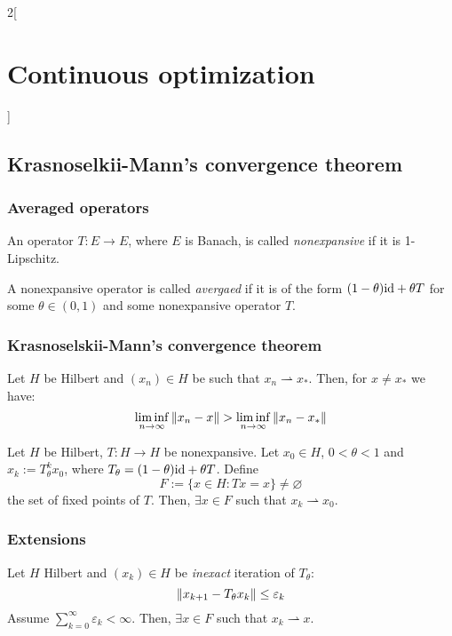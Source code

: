\documentclass[../../../main_math.tex]{subfiles}
\begin{document}
\begin{multicols}{2}[\section{Continuous optimization}]
  \subsection{Krasnoselkii-Mann's convergence theorem}
  \subsubsection{Averaged operators}
  \begin{definition}
    An operator $T:E\to E$, where $E$ is Banach, is called \emph{nonexpansive} if it is 1-Lipschitz.
  \end{definition}
  \begin{definition}
    A nonexpansive operator is called \emph{avergaed} if it is of the form $(1-\theta)\mathrm{id} +\theta T$ for some $\theta\in (0,1)$ and some nonexpansive operator $T$.
  \end{definition}
  \subsubsection{Krasnoselskii-Mann's convergence theorem}
  \begin{lemma}
    Let $H$ be Hilbert and $(x_n)\in H$ be such that $x_n\rightharpoonup x_*$. Then, for $x\ne x_*$ we have:
    $$
      \liminf_{n\to\infty} \norm{x_n-x}> \liminf_{n\to\infty}\norm{x_n-x_*}
    $$
  \end{lemma}
  \begin{theorem}
    Let $H$ be Hilbert, $T:H\to H$ be nonexpansive. Let $x_0\in H$, $0<\theta<1$ and $x_{k}:=T_\theta^kx_0$, where $T_\theta=(1-\theta)\mathrm{id}+\theta T$. Define
    $$
      F:=\{x\in H:Tx=x\}\ne \varnothing
    $$
    the set of fixed points of $T$.    Then, $\exists x\in F$ such that $x_k\rightharpoonup x_0$.
  \end{theorem}
  \subsubsection{Extensions}
  \begin{theorem}
    Let $H$ Hilbert and $(x_k)\in H$ be  \textit{inexact} iteration of $T_\theta$:
    $$
      \left\|x_{k+1}-T_\theta x_k\right\|\leq \varepsilon_k
    $$
    Assume $\sum_{k=0}^\infty \varepsilon_k<\infty$. Then, $\exists x\in F$ such that $x_k\rightharpoonup x$.
  \end{theorem}
\end{multicols}
\end{document}
